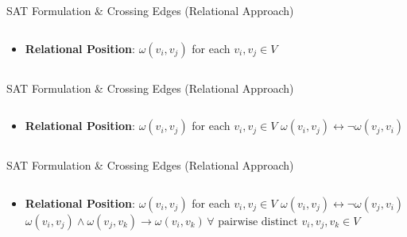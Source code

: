 \documentclass[hyperref={pdfpagelabels=false},aspectratio=169]{beamer}
\theoremstyle{definition}
\begin{document}
\begin{frame}{SAT Formulation \& Crossing Edges (Relational Approach)}
    \begin{columns}
        \begin{column}{1\textwidth}
            \begin{itemize}
                \item \textbf{Relational Position}:  $\omega(v_i,v_j)$ for each $v_i,v_j \in V$
            \end{itemize}
        \end{column}
    \end{columns}
\end{frame} 

\begin{frame}{SAT Formulation \& Crossing Edges (Relational Approach)}
    \begin{columns}
        \begin{column}{1\textwidth}
            \begin{itemize}
                \item \textbf{Relational Position}:  $\omega(v_i,v_j)$ for each $v_i,v_j \in V$
                \newline
                \newline
                \cdot $ \omega(v_i,v_j) \leftrightarrow \lnot \omega(v_j,v_i) $
            \end{itemize}
        \end{column}
    \end{columns}
\end{frame}

\begin{frame}{SAT Formulation \& Crossing Edges (Relational Approach)}
    \begin{columns}
        \begin{column}{1\textwidth}
            \begin{itemize}
                \item \textbf{Relational Position}:  $\omega(v_i,v_j)$ for each $v_i,v_j \in V$
                \newline
                \newline
                \cdot $ \omega(v_i,v_j) \leftrightarrow \lnot \omega(v_j,v_i) $
                \newline
                \newline
                \cdot $ \omega(v_i,v_j) \land \omega(v_j,v_k) \rightarrow \omega(v_i,v_k) \, \forall \text{ pairwise distinct } v_i,v_j,v_k \in V$
            \end{itemize}
        \end{column}
    \end{columns}
\end{frame}
\end{document}
